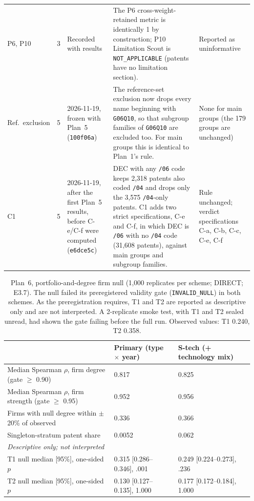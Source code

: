 \begin{table}[tbp]
\begin{tabular}{p{1.3cm}p{1.2cm}p{2.6cm}p{6.4cm}p{3.1cm}}
\addlinespace
\raggedright P6, P10 & \raggedright 3 & \raggedright Recorded with results & \raggedright The P6 cross-weight-retained metric is identically 1 by construction; P10 Limitation Scout is \texttt{NOT\_\allowbreak APPLICABLE} (patents have no limitation section). & \raggedright Reported as uninformative \tabularnewline
\addlinespace
\raggedright Ref.\ exclusion & \raggedright 5 & \raggedright 2026-11-19, frozen with Plan~5 (\texttt{100f06a}) & \raggedright The reference-set exclusion now drops every name beginning with \texttt{G06Q10}, so that subgroup families of \texttt{G06Q10} are excluded too. For main groups this is identical to Plan~1's rule. & \raggedright None for main groups (the 179 groups are unchanged) \tabularnewline
\addlinespace
\raggedright C1 & \raggedright 5 & \raggedright 2026-11-19, after the first Plan~5 results, before C-e/C-f were computed (\texttt{e6dce5c}) & \raggedright DEC with any \texttt{/06} code keeps 2,318 patents also coded \texttt{/04} and drops only the 3,575 \texttt{/04}-only patents. C1 adds two strict specifications, C-e and C-f, in which DEC is \texttt{/06} with no \texttt{/04} code (31,608 patents), against main groups and subgroup families. & \raggedright Rule unchanged; verdict specifications C-a, C-b, C-c, C-e, C-f \tabularnewline
\bottomrule
\end{tabular}
\end{table}

\begin{table}[tbp]
\centering
\caption{Plan~6, portfolio-and-degree firm null (1,000 replicates per scheme; DIRECT; E3.7). The null failed its preregistered validity gate (\texttt{INVALID\_\allowbreak NULL}) in both schemes. As the preregistration requires, T1 and T2 are reported as descriptive only and are not interpreted. A 2-replicate smoke test, with T1 and T2 sealed unread, had shown the gate failing before the full run. Observed values: T1 0.240, T2 0.358.}
\label{tab:app_plan6}
\footnotesize
\setlength{\tabcolsep}{4pt}
\begin{tabular}{lll}
\toprule
& Primary (type $\times$ year) & S-tech (+ technology mix) \\
\midrule
Median Spearman $\rho$, firm degree (gate $\geq$ 0.90) & 0.817 & 0.825 \\
Median Spearman $\rho$, firm strength (gate $\geq$ 0.95) & 0.952 & 0.956 \\
Firms with null degree within $\pm$20\% of observed & 0.336 & 0.366 \\
Singleton-stratum patent share & 0.0052 & 0.062 \\
\midrule
\multicolumn{3}{l}{\emph{Descriptive only; not interpreted}} \\
T1 null median [95\%], one-sided $p$ & 0.315 [0.286--0.346], .001 & 0.249 [0.224--0.273], .236 \\
T2 null median [95\%], one-sided $p$ & 0.130 [0.127--0.135], 1.000 & 0.177 [0.172--0.184], 1.000 \\
\bottomrule
\end{tabular}
\end{table}

